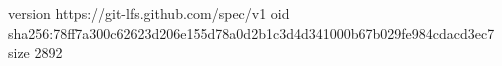 version https://git-lfs.github.com/spec/v1
oid sha256:78ff7a300c62623d206e155d78a0d2b1c3d4d341000b67b029fe984cdacd3ec7
size 2892
